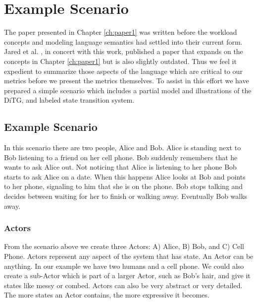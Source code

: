 \chapter{Example Scenario} \label{ch:example}

The paper presented in Chapter \ref{ch:paper1} was written before the workload concepts and modeling language semantics had settled into their current form.  Jared et al. \cite{moore2014modeling}, in concert with this work, published a paper that expands on the concepts in Chapter \ref{ch:paper1} but is also slightly outdated.  Thus we feel it expedient to summarize those aspects of the language which are critical to our metrics before we present the metrics themselves.  To assist in this effort we have prepared a simple scenario which includes a partial model and illustrations of the DiTG, and labeled state transition system.

\section{Example Scenario}
In this scenario there are two people, Alice and Bob.  Alice is standing next to Bob listening to a friend on her cell phone.  Bob suddenly remembers that he wants to ask Alice out.  Not noticing that Alice is listening to her phone Bob starts to ask Alice on a date.  When this happens Alice looks at Bob and points to her phone, signaling to him that she is on the phone.  Bob stops talking and decides between waiting for her to finish or walking away.  Eventually Bob walks away.

\subsection{Actors}
From the scenario above we create three Actors: A) Alice, B) Bob, and C) Cell Phone.  Actors represent any aspect of the system that has state.  An Actor can be anything.  In our example we have two humans and a cell phone.  We could also create a sub-Actor which is part of a larger Actor, such as Bob's hair, and give it states like messy or combed.  Actors can also be very abstract or very detailed.  The more states an Actor contains, the more expressive it becomes.

